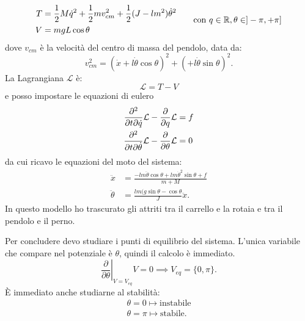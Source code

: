 \begin{equation*}
    \begin{aligned}
        T &= \frac 1 2 M  \dot q^2 + \frac 1 2 m v_{cm}^2 + \frac 1 2 (J - lm^2)\dot \theta^2 \\ %
        V &= mgL \cos\theta
    \end{aligned}
    \hspace{20pt} \text{con } q \in \R, \theta \in ]-\pi, +\pi]
    \label{eq:energy}
\end{equation*}
dove $v_{cm}$ è la velocità del centro di massa del pendolo, data da:
\begin{equation*}
    v^2_{cm} = (\dot x + l \dot \theta \cos \theta)^2 + (+ l \dot \theta \sin \theta)^2.
\end{equation*}
La Lagrangiana $\mathcal L$ è:
\begin{equation*}
    \mathcal L = T - V
\end{equation*}
e posso impostare le equazioni di eulero
\begin{equation*}
    \begin{aligned}
        \frac{\partial^2}{\partial t \partial \dot q} \mathcal L - \frac \partial {\partial q} \mathcal L &= f \\
        \frac{\partial^2}{\partial t \partial \dot \theta} \mathcal L  - \frac \partial {\partial \theta} \mathcal L &= 0
    \end{aligned}
    \label{eq:eulero}
\end{equation*}
da cui ricavo le equazioni del moto del sistema:
\begin{equation}
    \begin{aligned}
        \ddot x &= \frac {-lm \ddot \theta \cos \theta + lm \dot \theta^2 \sin \theta + f} {m + M} \\
        \ddot \theta &= \frac {lm (g\sin \theta - \cos \theta }{J} \ddot x.
    \end{aligned}
    \label{eq:moto-sistema}
\end{equation}
In questo modello ho trascurato gli attriti tra il carrello e la rotaia e tra
il pendolo e il perno.

Per concludere devo studiare i punti di equilibrio del sistema.
L'unica variabile che compare nel potenziale è $\theta$, quindi il calcolo è
immediato.
\begin{equation*}
    \left. \frac \partial {\partial \theta}\right |_{V=V_{eq}} V =  0 \implies V_{eq} = \{0, \pi\}.
\end{equation*}
È immediato anche studiarne al stabilità:
\begin{align*}
    \theta = 0 \mapsto \text{instabile} \\
    \theta = \pi \mapsto \text{stabile}.
\end{align*}

